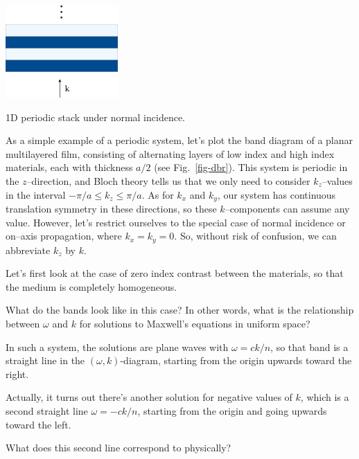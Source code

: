 \pagebreak


\begin{marginfigure}
\centering
\includegraphics{symmetry/figures/dbr}
\caption{1D periodic stack under normal incidence.}
\label{fig-dbr}
\end{marginfigure}

As a simple example of a periodic system, let's plot the band diagram of a planar multilayered film, consisting of alternating layers of low index and high index materials, each with thickness $a/2$ (see Fig.~\ref{fig-dbr}). This system is periodic in the $z$--direction, and Bloch theory tells us that we only need to consider $k_z$--values in the interval $-\pi / a \le k_z \le \pi / a$. As for $k_x$ and $k_y$, our system has continuous translation symmetry in these directions, so these $k$--components can assume any value. However, let's restrict ourselves to the special case of normal incidence or on--axis propagation, where $k_x=k_y=0$. So, without risk of confusion, we can abbreviate $k_z$ by $k$.

Let's first look at the case of zero index contrast between the materials, so that the medium is completely homogeneous.

\begin{cue}
What do the bands look like in this case? In other words, what is the relationship between $\omega$ and $k$ for solutions to Maxwell's equations in uniform space?
\end{cue}

In such a system, the solutions are plane waves with $\omega = c k / n$, so that band is a straight line in the $(\omega, k)$-diagram, starting from the origin upwards toward the right.

Actually, it turns out there's another solution for negative values of $k$, which is a second straight line $\omega = - c k / n$, starting from the origin and going upwards toward the left.

\begin{cue}
What does this second line correspond to physically?
\end{cue}

